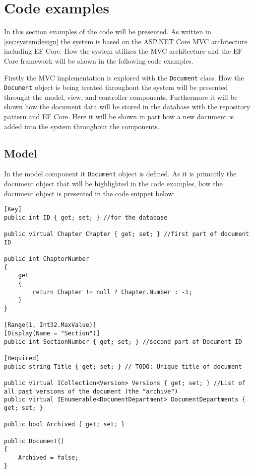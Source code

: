 \section{Code examples}
In this section examples of the code will be presented.
As written in \cref{sec:systemdesign} the system is based on the ASP.NET Core MVC architecture including EF Core.
How the system utilizes the MVC architecture and the EF Core framework will be shown in the following code examples.

Firstly the MVC implementation is explored with the \texttt{Document} class.
How the \texttt{Document} object is being treated throughout the system will be presented throught the model, view, and controller components.
Furthermore it will be shown how the document data will be stored in the database with the repository pattern and EF Core.
Here it will be shown in part how a new document is added into the system throughout the components.

\subsection{Model}

In the model component it \texttt{Document} object is defined.
As it is primarily the document object that will be highlighted in the code examples, how the document object is presented in the code snippet below:
\\
\begin{lstlisting}[caption={Document Model: Document object}, label={lst:doc}]
[Key]
public int ID { get; set; } //for the database

public virtual Chapter Chapter { get; set; } //first part of document ID

public int ChapterNumber
{
	get
	{
		return Chapter != null ? Chapter.Number : -1;
	}
}

[Range(1, Int32.MaxValue)]
[Display(Name = "Section")]
public int SectionNumber { get; set; } //second part of Document ID

[Required]
public string Title { get; set; } // TODO: Unique title of document

public virtual ICollection<Version> Versions { get; set; } //List of all past versions of the document (the "archive")
public virtual IEnumerable<DocumentDepartment> DocumentDepartments { get; set; }

public bool Archived { get; set; }

public Document()
{
	Archived = false;
}
\end{lstlisting}

